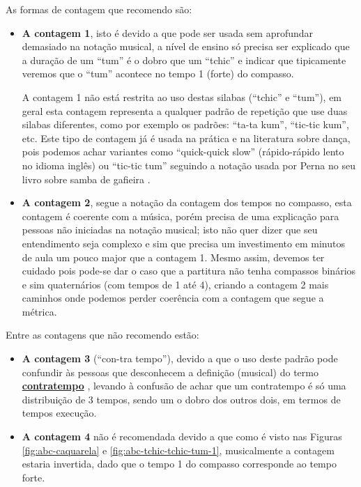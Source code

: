 As formas de contagem que recomendo são:
\begin{itemize}
\item \textbf{A contagem 1}, 
isto é devido a que pode ser usada sem aprofundar demasiado 
na notação musical, a nível de ensino só precisa ser explicado que a duração de um 
``tum'' é o dobro que um ``tchic'' e indicar que tipicamente veremos que o ``tum''
acontece no tempo 1 (forte) do compasso.

A contagem 1 não está restrita ao uso destas silabas (``tchic'' e ``tum''), 
em geral esta contagem representa a qualquer padrão de repetição
que use duas silabas diferentes, como por exemplo os padrões: ``ta-ta kum'', ``tic-tic kum'', etc. 
Este tipo de contagem já é usada na prática e na literatura sobre dança, pois 
podemos achar variantes como ``quick-quick slow'' (rápido-rápido lento no idioma inglês)
ou ``tic-tic tum'' seguindo a notação usada por Perna no seu livro sobre samba de gafieira \cite[pp. 146]{perna2002samba}.
\item \textbf{A contagem 2}, segue a notação da contagem dos tempos no compasso, esta
contagem é coerente com a música, porém precisa de uma explicação  
para pessoas não iniciadas na notação musical; isto não quer dizer que seu
entendimento seja complexo e sim que precisa um investimento em minutos de aula
um pouco major que a contagem 1.
Mesmo assim, devemos ter cuidado pois pode-se dar o caso que a partitura não tenha compassos binários 
e sim quaternários (com tempos de 1 até 4), 
criando a contagem 2 mais caminhos onde podemos perder coerência com a contagem que segue a métrica.
\end{itemize}


Entre as contagens que não recomendo estão:
\begin{itemize}
\item \textbf{A contagem 3} (``con-tra tempo''), 
devido a que o uso deste padrão pode confundir às pessoas que desconhecem 
a definição (musical) do termo \hyperref[sec:contratempo]{\textbf{contratempo}} 
\cite[pp. 16]{mascarenhascurso} \cite[pp. 36]{azevedocompor}, 
levando à confusão de achar que um contratempo é só uma distribuição de 3 tempos, 
sendo um o dobro dos outros dois, em termos de tempos execução.
\item \textbf{A contagem 4} não é recomendada devido a que como é visto nas Figuras 
\ref{fig:abc-caquarela} e \ref{fig:abc-tchic-tchic-tum-1}, musicalmente a contagem estaria invertida,
dado que o tempo 1 do compasso corresponde ao tempo forte.
\end{itemize}~

